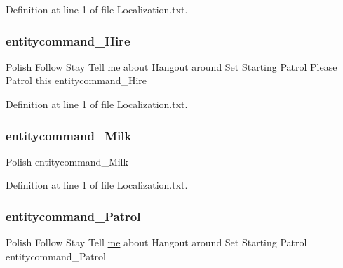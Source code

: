 Definition at line 1 of file Localization.\+txt.

\mbox{\label{_blooms_01_animal_01_husbandry_2_config_2_localization_8txt_a57ff35422d68d8b614232e0f19a5f017}} 
\subsubsection{\texorpdfstring{entitycommand\_Hire}{entitycommand\_Hire}}
{\footnotesize\ttfamily Polish Follow Stay Tell \mbox{\hyperlink{_blooms_01_animal_01_husbandry_2_config_2_localization_8txt_a290fbecf7c016b09bc675718400d6fca}{me}} about Hangout around Set Starting Patrol Please Patrol this entitycommand\+\_\+\+Hire}



Definition at line 1 of file Localization.\+txt.

\mbox{\label{_blooms_01_animal_01_husbandry_2_config_2_localization_8txt_ae4fac992f5dd84058c4d409bb5f31948}} 
\subsubsection{\texorpdfstring{entitycommand\_Milk}{entitycommand\_Milk}}
{\footnotesize\ttfamily Polish entitycommand\+\_\+\+Milk}



Definition at line 1 of file Localization.\+txt.

\mbox{\label{_blooms_01_animal_01_husbandry_2_config_2_localization_8txt_a7a2a1699b592866d82ea4ab3f0542dbc}} 
\subsubsection{\texorpdfstring{entitycommand\_Patrol}{entitycommand\_Patrol}}
{\footnotesize\ttfamily Polish Follow Stay Tell \mbox{\hyperlink{_blooms_01_animal_01_husbandry_2_config_2_localization_8txt_a290fbecf7c016b09bc675718400d6fca}{me}} about Hangout around Set Starting Patrol entitycommand\+\_\+\+Patrol}



